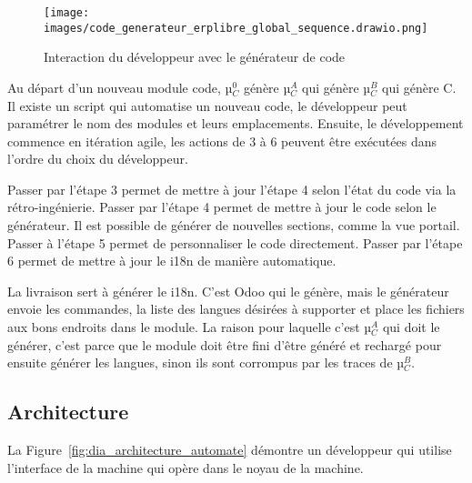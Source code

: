 \begin{figure}[htb]
\centering
\texttt{[image: images/code\_generateur\_erplibre\_global\_sequence.drawio.png]}
\caption{Interaction du développeur avec le générateur de code}
\label{fig:dia_sequence_gc}
\end{figure}

Au départ d’un nouveau module code, µ$_C^0$ génère µ$_C^A$ qui génère µ$_C^B$ qui génère C. Il existe un script qui automatise un nouveau code, le développeur peut paramétrer le nom des modules et leurs emplacements. Ensuite, le développement commence en itération agile, les actions de 3 à 6 peuvent être exécutées dans l’ordre du choix du développeur.


Passer par l’étape 3 permet de mettre à jour l’étape 4 selon l’état du code via la rétro-ingénierie. Passer par l’étape 4 permet de mettre à jour le code selon le générateur. Il est possible de générer de nouvelles sections, comme la vue portail. Passer à l’étape 5 permet de personnaliser le code directement. Passer par l’étape 6 permet de mettre à jour le i18n de manière automatique.

La livraison sert à générer le i18n. C’est Odoo qui le génère, mais le générateur envoie les commandes, la liste des langues désirées à supporter et place les fichiers aux bons endroits dans le module. La raison pour laquelle c’est µ$_C^A$ qui doit le générer, c’est parce que le module doit être fini d’être généré et rechargé pour ensuite générer les langues, sinon ils sont corrompus par les traces de µ$_C^B$.


\subsection{Architecture}\label{architecture_result}

La Figure~\ref{fig:dia_architecture_automate} démontre un développeur qui utilise l'interface de la machine qui opère dans le noyau de la machine.

